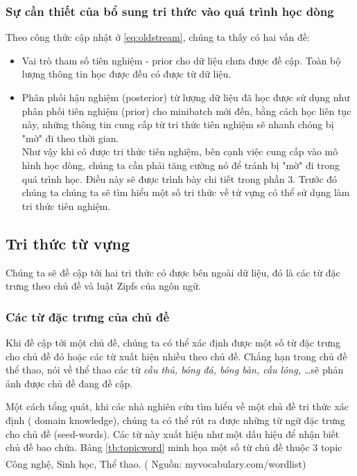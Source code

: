 \documentclass[fontsize=13pt]{scrartcl}
\begin{document}
\subsubsection{Sự cần thiết của bổ sung tri thức vào quá trình học dòng}
Theo công thức cập nhật ở \ref{eq:oldstream}, chúng ta thấy có hai vấn đề:
\begin{itemize}
\item Vai trò tham số tiên nghiệm - prior cho dữ liệu chưa được đề cập. Toàn bộ lượng thông tin học được đều có được từ dữ liệu.
\item Phân phối hậu nghiệm (posterior) từ lượng dữ liệu đã học được sử dụng như phân phối tiên nghiệm (prior) cho minibatch mới đến, bằng cách học liên tục này, những thông tin cung cấp từ tri thức tiên nghiệm sẽ nhanh chóng bị "mờ" đi theo thời gian.\\
Như vậy khi có được tri thức tiên nghiệm, bên cạnh việc cung cấp vào mô hình học dòng, chúng ta cần phải tăng cường nó để tránh bị "mờ" đi trong quá trình học. Điều này sẽ được trình bày chi tiết trong phần 3. Trước đó chúng ta chúng ta sẽ tìm hiểu một số tri thức về từ vựng có thể sử dụng làm tri thức tiên nghiệm.
\end{itemize}
\subsection{Tri thức từ vựng}\label{sub:wordknowledge}
Chúng ta sẽ đề cập tới hai tri thức có được bên ngoài dữ liệu, đó là các từ đặc trưng theo chủ đề và luật Zipfs của ngôn ngữ. 
\subsubsection{ Các từ đặc trưng của chủ đề}
Khi đề cập tới một chủ đề, chúng ta có thể xác định được một số từ đặc trưng cho chủ đề đó hoặc các từ xuất hiện nhiều theo chủ đề. Chẳng hạn trong chủ đề thể thao, nói về thể thao các từ \textit{ cầu thủ, bóng đá, bóng bàn, cầu lông, \ldots }sẽ phản ảnh được chủ đề đang đề cập.
\par
Một cách tổng quát, khi các nhà nghiên cứu tìm hiểu về một chủ đề tri thức xác định ( domain knowledge), chúng ta có thể rút ra được những từ ngữ đặc trưng cho chủ đề (seed-words). Các từ này xuất hiện như một dấu hiệu để nhận biết chủ đề bao chứa. Bảng \ref{tb:topicword} minh họa một số từ chủ đề thuộc 3 topic Công nghệ, Sinh học, Thể thao. ( Nguồn: myvocabulary.com/wordlist\textsuperscript{\cite{listwordtopic}})
\end{document}

